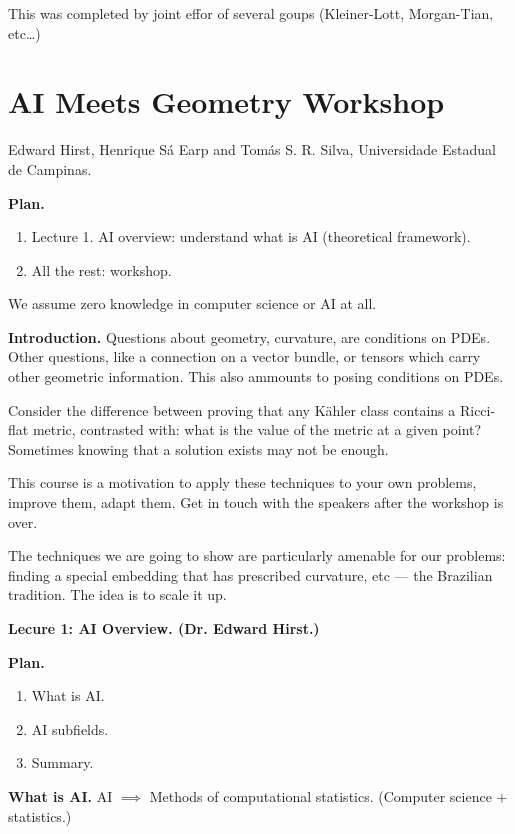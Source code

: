 This was completed by joint effor of several
goups (Kleiner-Lott, Morgan-Tian, etc…)






\section{AI Meets Geometry Workshop}
\label{section-ai-meets-geometry}

\medskip\noindent
Edward Hirst, Henrique S\'a Earp and
Tom\'as S. R. Silva,
Universidade Estadual de Campinas.

\medskip\noindent
{\bf Plan.}
\begin{enumerate}
\item Lecture 1. AI overview: understand
what is AI (theoretical framework).
\item All the rest: workshop.
\end{enumerate}

\noindent
We assume zero knowledge in computer
science or AI at all.

\medskip\noindent
{\bf Introduction.} 
Questions about geometry, curvature,
are conditions on PDEs. Other questions,
like
a connection on a vector bundle, or tensors
which carry other geometric information.
This also ammounts to posing conditions on PDEs.

Consider the difference between proving
that any Kähler class contains a Ricci-flat
metric, contrasted with: what is the value
of the metric at a given point?
Sometimes knowing that a solution exists may
not be enough.

This course is a motivation to apply these
techniques to your own problems, improve
them, adapt them. Get in touch with the
speakers after the workshop is over.

The techniques we are going to show are
particularly amenable for our problems:
finding a special embedding that has
prescribed curvature, etc --- the 
Brazilian tradition.
The idea is to scale it up.

\medskip
\medskip\noindent
{\bf Lecure 1: AI Overview.
(Dr. Edward Hirst.)}

\medskip\noindent
{\bf Plan.}
\begin{enumerate}
\item What is AI.
\item AI subfields.
\item Summary.
\end{enumerate}

\medskip\noindent
{\bf What is AI.}
AI $\implies $ Methods of computational
statistics. (Computer science + statistics.)

